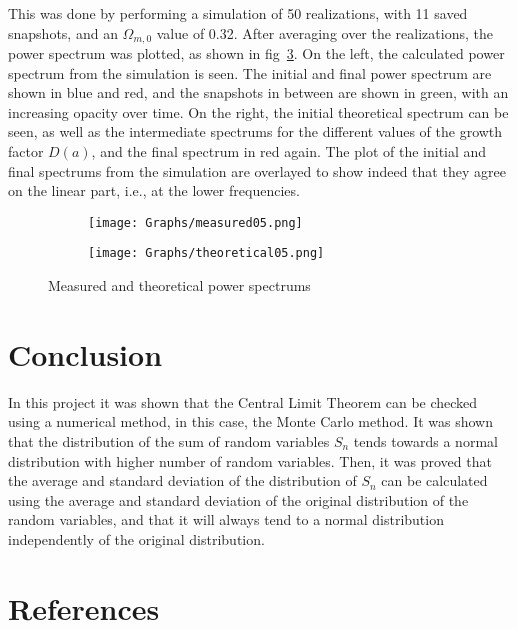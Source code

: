 \documentclass[12pt]{article}
\begin{document}
This was done by performing a simulation of 50 realizations, with 11 saved snapshots, and an $\Omega_{m,0}$ value of 0.32. After averaging over the realizations, the power spectrum was plotted, as shown in fig~\ref{fig:spectrum05}. On the left, the calculated power spectrum from the simulation is seen. The initial and final power spectrum are shown in blue and red, and the snapshots in between are shown in green, with an increasing opacity over time. On the right, the initial theoretical spectrum can be seen, as well as the intermediate spectrums for the different values of the growth factor $D(a)$, and the final spectrum in red again. The plot of the initial and final spectrums from the simulation are overlayed to show indeed that they agree on the linear part, i.e., at the lower frequencies.

\begin{figure}[htp]
	\centering
	\begin{subfigure}[b]{0.9\textwidth}
		\centering
		\texttt{[image: Graphs/measured05.png]}
		\caption{}
		\label{fig:measured05}
	\end{subfigure}
	\hfill
	\begin{subfigure}[b]{0.9\textwidth}
		\centering
		\texttt{[image: Graphs/theoretical05.png]}
		\caption{}
		\label{fig:theoretical05}
	\end{subfigure}
	\caption{Measured and theoretical power spectrums}
	\label{fig:spectrum05}
\end{figure}




\section*{Conclusion}
In this project it was shown that the Central Limit Theorem can be checked using a numerical method, in this case, the Monte Carlo method. It was shown that the distribution of the sum of random variables $S_{n}$ tends towards a normal distribution with higher number of random variables. Then, it was proved that the average and standard deviation of the distribution of $S_{n}$ can be calculated using the average and standard deviation of the original distribution of the random variables, and that it will always tend to a normal distribution independently of the original distribution.


\section*{References}
\printbibliography[heading=none]
\end{document}
